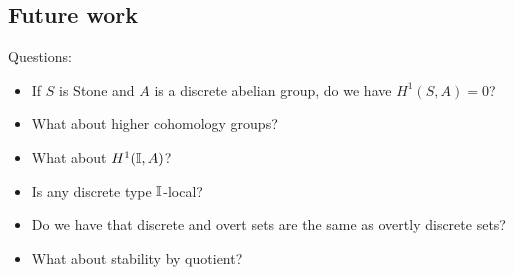 



\subsection{Future work}

Questions:
\begin{itemize}
\item If $S$ is Stone and $A$ is a discrete abelian group, do we have $H^1(S,A) = 0$? 
\item What about higher cohomology groups? 
\item What about $H^1(\mathbb{I},A)$? 
\item Is any discrete type $\mathbb{I}$-local? 
\item Do we have that discrete and overt sets are the same as overtly discrete sets?
\item What about stability by quotient?
\end{itemize}